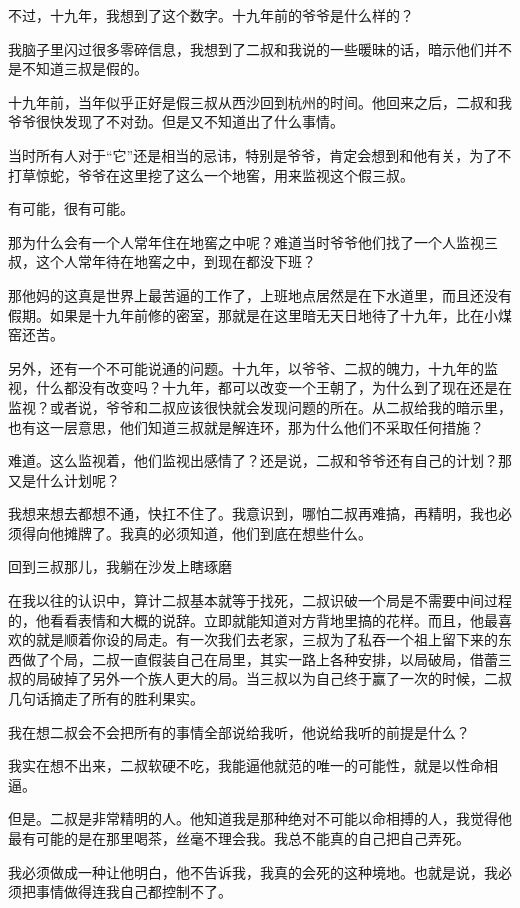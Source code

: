 不过，十九年，我想到了这个数字。十九年前的爷爷是什么样的？

我脑子里闪过很多零碎信息，我想到了二叔和我说的一些暖昧的话，暗示他们并不是不知道三叔是假的。

十九年前，当年似乎正好是假三叔从西沙回到杭州的时间。他回来之后，二叔和我爷爷很快发现了不对劲。但是又不知道出了什么事情。

当时所有人对于“它”还是相当的忌讳，特别是爷爷，肯定会想到和他有关，为了不打草惊蛇，爷爷在这里挖了这么一个地窖，用来监视这个假三叔。

有可能，很有可能。

那为什么会有一个人常年住在地窖之中呢？难道当时爷爷他们找了一个人监视三叔，这个人常年待在地窖之中，到现在都没下班？

那他妈的这真是世界上最苦逼的工作了，上班地点居然是在下水道里，而且还没有假期。如果是十九年前修的密室，那就是在这里暗无天日地待了十九年，比在小煤窑还苦。

另外，还有一个不可能说通的问题。十九年，以爷爷、二叔的魄力，十九年的监视，什么都没有改变吗？十九年，都可以改变一个王朝了，为什么到了现在还是在监视？或者说，爷爷和二叔应该很快就会发现问题的所在。从二叔给我的暗示里，也有这一层意思，他们知道三叔就是解连环，那为什么他们不采取任何措施？

难道。这么监视着，他们监视出感情了？还是说，二叔和爷爷还有自己的计划？那又是什么计划呢？

我想来想去都想不通，快扛不住了。我意识到，哪怕二叔再难搞，再精明，我也必须得向他摊牌了。我真的必须知道，他们到底在想些什么。

回到三叔那儿，我躺在沙发上瞎琢磨

在我以往的认识中，算计二叔基本就等于找死，二叔识破一个局是不需要中间过程的，他看看表情和大概的说辞。立即就能知道对方背地里搞的花样。而且，他最喜欢的就是顺着你设的局走。有一次我们去老家，三叔为了私吞一个祖上留下来的东西做了个局，二叔一直假装自己在局里，其实一路上各种安排，以局破局，借蕾三叔的局破掉了另外一个族人更大的局。当三叔以为自己终于赢了一次的时候，二叔几句话摘走了所有的胜利果实。

我在想二叔会不会把所有的事情全部说给我听，他说给我听的前提是什么？

我实在想不出来，二叔软硬不吃，我能逼他就范的唯一的可能性，就是以性命相逼。

但是。二叔是非常精明的人。他知道我是那种绝对不可能以命相搏的人，我觉得他最有可能的是在那里喝茶，丝毫不理会我。我总不能真的自己把自己弄死。

我必须做成一种让他明白，他不告诉我，我真的会死的这种境地。也就是说，我必须把事情做得连我自己都控制不了。

